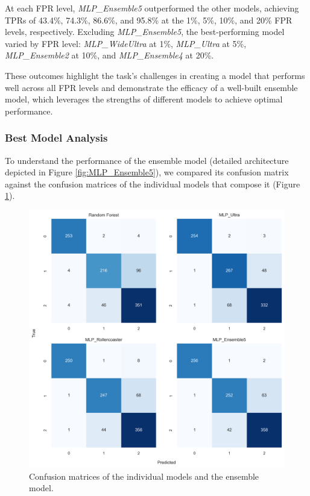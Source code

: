 At each FPR level, \textit{MLP\_Ensemble5} outperformed the other models, 
achieving TPRs of 43.4\%, 74.3\%, 86.6\%, and 95.8\% at the 1\%, 5\%, 10\%, and 20\% FPR levels, 
respectively. Excluding \textit{MLP\_Ensemble5}, the best-performing model varied by 
FPR level: \textit{MLP\_WideUltra} at 1\%, \textit{MLP\_Ultra} at 5\%, \textit{MLP\_Ensemble2} at 10\%, 
and \textit{MLP\_Ensemble4} at 20\%.

These outcomes highlight the task's challenges in creating a model that performs well across all FPR 
levels and demonstrate the efficacy of a well-built ensemble model, which leverages the strengths of 
different models to achieve optimal performance.

\subsubsection*{Best Model Analysis}

To understand the performance of the ensemble model (detailed architecture depicted in Figure \ref{fig:MLP_Ensemble5}), we compared its confusion matrix against 
the confusion matrices of the individual models that compose it
(Figure \ref{fig:confmat_ensemble_vs_individual}).

\begin{figure}[H]
    \centering
    \includegraphics[width=.8\columnwidth]{./images/confmat_ensemble_vs_individual.png}
    \caption{Confusion matrices of the individual models and the ensemble model.}
    \label{fig:confmat_ensemble_vs_individual}
\end{figure}

